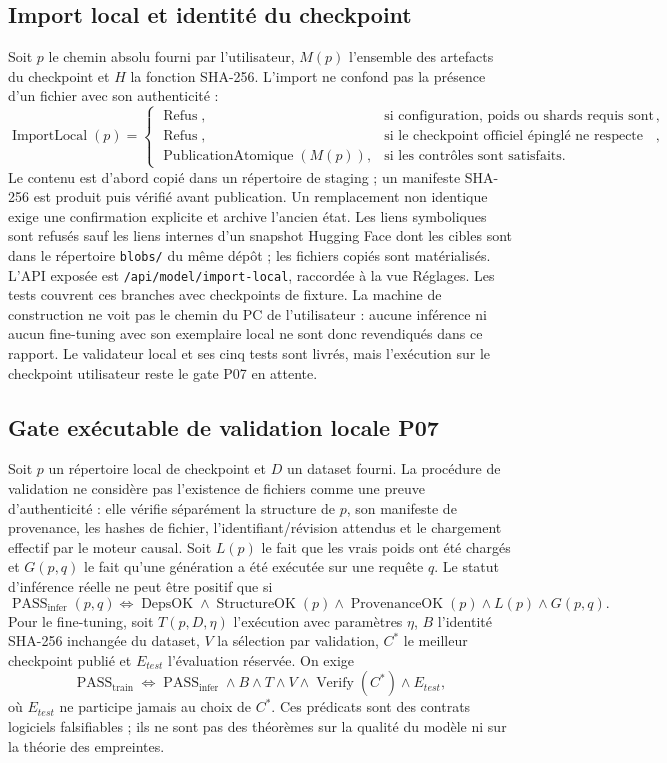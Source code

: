 \documentclass[11pt,a4paper]{article}
\begin{document}
\subsection{Import local et identité du checkpoint}
Soit $p$ le chemin absolu fourni par l’utilisateur, $M(p)$ l’ensemble des artefacts du checkpoint et $H$ la fonction SHA-256. L’import ne confond pas la présence d’un fichier avec son authenticité :
\[
\operatorname{ImportLocal}(p)=\begin{cases}
\operatorname{Refus},&\text{si configuration, poids ou shards requis sont absents/incohérents},\\
\operatorname{Refus},&\text{si le checkpoint officiel épinglé ne respecte pas le hash attendu},\\
\operatorname{PublicationAtomique}(M(p)),&\text{si les contrôles sont satisfaits}.
\end{cases}
\]
Le contenu est d’abord copié dans un répertoire de staging ; un manifeste SHA-256 est produit puis vérifié avant publication. Un remplacement non identique exige une confirmation explicite et archive l’ancien état. Les liens symboliques sont refusés sauf les liens internes d’un snapshot Hugging Face dont les cibles sont dans le répertoire \texttt{blobs/} du même dépôt ; les fichiers copiés sont matérialisés. L’API exposée est \texttt{/api/model/import-local}, raccordée à la vue Réglages. Les tests couvrent ces branches avec checkpoints de fixture. La machine de construction ne voit pas le chemin du PC de l’utilisateur : aucune inférence ni aucun fine-tuning avec son exemplaire local ne sont donc revendiqués dans ce rapport. Le validateur local et ses cinq tests sont livrés, mais l’exécution sur le checkpoint utilisateur reste le gate P07 en attente.

\subsection{Gate exécutable de validation locale P07}
Soit $p$ un répertoire local de checkpoint et $D$ un dataset fourni. La procédure de validation ne considère pas l'existence de fichiers comme une preuve d'authenticité : elle vérifie séparément la structure de $p$, son manifeste de provenance, les hashes de fichier, l'identifiant/révision attendus et le chargement effectif par le moteur causal. Soit $L(p)$ le fait que les vrais poids ont été chargés et $G(p,q)$ le fait qu'une génération a été exécutée sur une requête $q$. Le statut d'inférence réelle ne peut être positif que si
\[
\operatorname{PASS}_{\mathrm{infer}}(p,q)
\Longleftrightarrow
\operatorname{DepsOK}\land\operatorname{StructureOK}(p)
\land\operatorname{ProvenanceOK}(p)\land L(p)\land G(p,q).
\]
Pour le fine-tuning, soit $T(p,D,\eta)$ l'exécution avec paramètres $\eta$, $B$ l'identité SHA-256 inchangée du dataset, $V$ la sélection par validation, $C^*$ le meilleur checkpoint publié et $E_{test}$ l'évaluation réservée. On exige
\[
\operatorname{PASS}_{\mathrm{train}}
\Longleftrightarrow
\operatorname{PASS}_{\mathrm{infer}}\land B\land T\land V
\land\operatorname{Verify}(C^*)\land E_{test},
\]
où $E_{test}$ ne participe jamais au choix de $C^*$. Ces prédicats sont des contrats logiciels falsifiables ; ils ne sont pas des théorèmes sur la qualité du modèle ni sur la théorie des empreintes.
\end{document}
